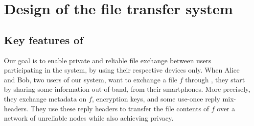 
\section{Design of the \name file transfer system}%
\label{design}


\subsection{Key features of \name}

Our goal is to enable private and reliable file exchange between users 
participating in the system, by using their respective devices only.
When Alice and Bob, two users of our system, want to exchange a file \(f\) 
through \name, they start by sharing some information out-of-band, \eg from 
their smartphones.
More precisely, they exchange metadata on \(f\), encryption keys, and
some use-once reply mix-headers.
They use these reply headers to transfer the file contents of \(f\) over a 
network of unreliable nodes while also achieving privacy.



